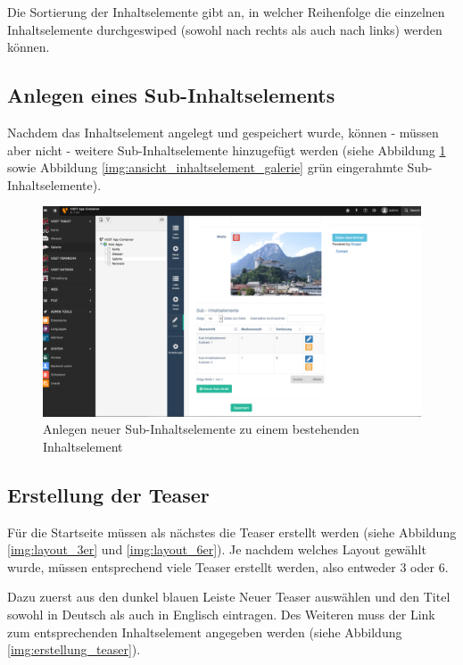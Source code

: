 Die Sortierung der Inhaltselemente gibt an, in welcher Reihenfolge die einzelnen Inhaltselemente durchgeswiped (sowohl nach rechts als auch nach links) werden können.


\subsection{Anlegen eines Sub-Inhaltselements}
Nachdem das Inhaltselement angelegt und gespeichert wurde, können - müssen aber nicht - weitere Sub-Inhaltselemente hinzugefügt werden (siehe Abbildung \ref{img:anlegen_neuer_Sub_inhaltselemente} sowie Abbildung \ref{img:ansicht_inhaltselement_galerie} grün eingerahmte Sub-Inhaltselemente).

\begin{figure}[ht!]
\centering
\includegraphics[width=12cm]{Figures/paula/galerie/anlegen_neuer_Sub_inhaltselemente.png}
\caption{Anlegen neuer Sub-Inhaltselemente zu einem bestehenden Inhaltselement}
\label{img:anlegen_neuer_Sub_inhaltselemente}
\end{figure}


\subsection{Erstellung der Teaser}

Für die Startseite müssen als nächstes die Teaser erstellt werden (siehe Abbildung \ref{img:layout_3er} und \ref{img:layout_6er}). Je nachdem welches Layout gewählt wurde, müssen entsprechend viele Teaser erstellt werden, also entweder 3 oder 6. 

Dazu zuerst aus den dunkel blauen Leiste Neuer Teaser auswählen und den Titel sowohl in Deutsch als auch in Englisch eintragen. Des Weiteren muss der Link zum entsprechenden Inhaltselement angegeben werden (siehe Abbildung \ref{img:erstellung_teaser}). 

